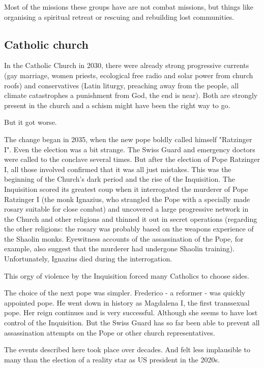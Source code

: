 Most of the missions these groups have are not combat missions, but things like organising a spiritual retreat or rescuing and rebuilding lost communities.

\subsection{Catholic church}

In the Catholic Church in 2030, there were already strong progressive currents (gay marriage, women priests, ecological free radio and solar power from church roofs) and conservatives (Latin liturgy, preaching away from the people, all climate catastrophes a punishment from God, the end is near). Both are strongly present in the church and a schism might have been the right way to go.

But it got worse.

The change began in 2035, when the new pope boldly called himself "Ratzinger I". Even the election was a bit strange. The Swiss Guard and emergency doctors were called to the conclave several times. But after the election of Pope Ratzinger I, all those involved confirmed that it was all just mistakes. This was the beginning of the Church's dark period and the rise of the Inquisition. The Inquisition scored its greatest coup when it interrogated the murderer of Pope Ratzinger I (the monk Ignazius, who strangled the Pope with a specially made rosary suitable for close combat) and uncovered a large progressive network in the Church and other religions and thinned it out in secret operations (regarding the other religions: the rosary was probably based on the weapons experience of the Shaolin monks. Eyewitness accounts of the assassination of the Pope, for example, also suggest that the murderer had undergone Shaolin training). Unfortunately, Ignazius died during the interrogation.

This orgy of violence by the Inquisition forced many Catholics to choose sides.

The choice of the next pope was simpler. Frederico - a reformer - was quickly appointed pope. He went down in history as Magdalena I, the first transsexual pope. Her reign continues and is very successful. Although she seems to have lost control of the Inquisition. But the Swiss Guard has so far been able to prevent all assassination attempts on the Pope or other church representatives.

The events described here took place over decades. And felt less implausible to many than the election of a reality star as US president in the 2020s.



